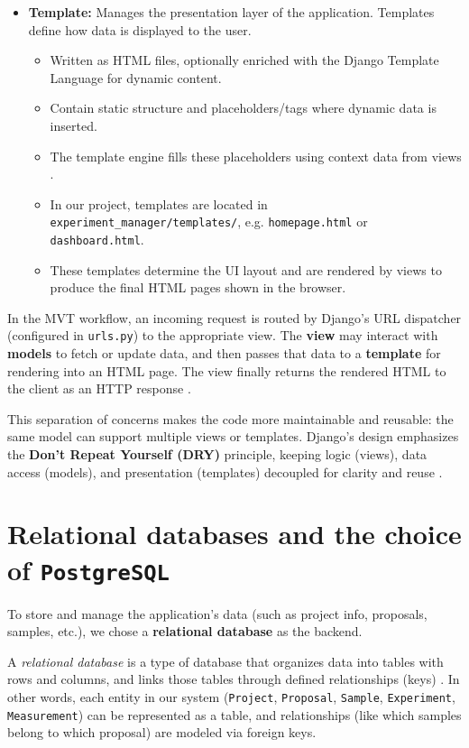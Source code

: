 \begin{itemize}
	\item \textbf{Template:} Manages the presentation layer of the application. Templates define how data is displayed to the user.
	\begin{itemize}
		\item Written as HTML files, optionally enriched with the Django Template Language for dynamic content. 
		\item Contain static structure and placeholders/tags where dynamic data is inserted. 
		\item The template engine fills these placeholders using context data from views \parencite{DjangoTemplates}. 
		\item In our project, templates are located in \texttt{experiment\_manager/templates/}, e.g. \texttt{homepage.html} or \texttt{dashboard.html}. 
		\item These templates determine the UI layout and are rendered by views to produce the final HTML pages shown in the browser. 
	\end{itemize}
\end{itemize}

In the MVT workflow, an incoming request is routed by Django’s URL dispatcher (configured in \texttt{urls.py}) to the appropriate view. The \textbf{view} may interact with \textbf{models} to fetch or update data, and then passes that data to a \textbf{template} for rendering into an HTML page. The view finally returns the rendered HTML to the client as an HTTP response \parencite{DjangoRequestResponse,DjangoURLDispatcher}. 

This separation of concerns makes the code more maintainable and reusable: the same model can support multiple views or templates. Django’s design emphasizes the \textbf{Don’t Repeat Yourself (DRY)} principle, keeping logic (views), data access (models), and presentation (templates) decoupled for clarity and reuse \parencite{DjangoPhilosophy}.

\section{Relational databases and the choice of \texttt{PostgreSQL}}

To store and manage the application’s data (such as project info, proposals, 
samples, etc.), we chose a \textbf{relational database} as the backend. 

A \emph{relational database} is a type of database that organizes data into 
tables with rows and columns, and links those tables through defined 
relationships (keys) \parencite{ElmasriNavathe}. In other words, each entity in 
our system (\texttt{Project}, \texttt{Proposal}, \texttt{Sample}, 
\texttt{Experiment}, \texttt{Measurement}) can be represented as a table, and 
relationships (like which samples belong to which proposal) are modeled via 
foreign keys. 

